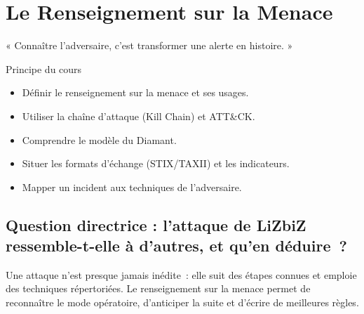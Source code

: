 
\chapter{Le Renseignement sur la Menace}
\label{chap:renseignement}

\epigraph{%
    « Connaître l'adversaire, c'est transformer une alerte en histoire. »%
}{Principe du cours}


\begin{boxobjectifs}
\begin{itemize}
    \item Définir le renseignement sur la menace et ses usages.
    \item Utiliser la chaîne d'attaque (Kill Chain) et ATT\&CK.
    \item Comprendre le modèle du Diamant.
    \item Situer les formats d'échange (STIX/TAXII) et les indicateurs.
    \item Mapper un incident aux techniques de l'adversaire.
\end{itemize}
\end{boxobjectifs}

\bigskip

\section*{Question directrice : l'attaque de LiZbiZ ressemble-t-elle à d'autres, et qu'en déduire~?}

Une attaque n'est presque jamais inédite~: elle suit des étapes connues et
emploie des techniques répertoriées. Le renseignement sur la menace permet de
reconnaître le mode opératoire, d'anticiper la suite et d'écrire de meilleures
règles.


